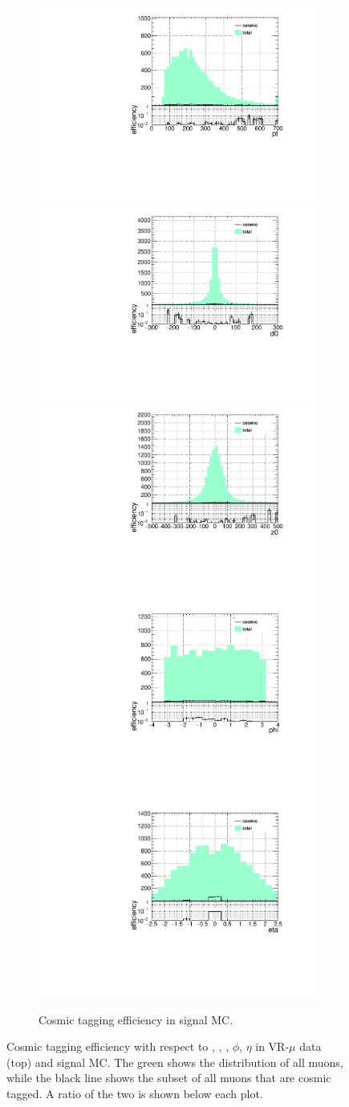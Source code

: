 \begin{figure}[h]
  \begin{subfigure}[b]{\textwidth}
  	\centering
  	\includegraphics[width=.3\textwidth]{figures/cosmics/mc_300_ratio_pt.pdf}
  	\includegraphics[width=.3\textwidth]{figures/cosmics/mc_300_ratio_d0.pdf}
  	\includegraphics[width=.3\textwidth]{figures/cosmics/mc_300_ratio_z0.pdf}
  	\includegraphics[width=.3\textwidth]{figures/cosmics/mc_300_ratio_phi.pdf}
  	\includegraphics[width=.3\textwidth]{figures/cosmics/mc_300_ratio_eta.pdf}
  	\caption{Cosmic tagging efficiency in signal \ac{MC}.}
  \end{subfigure}
    \caption{Cosmic tagging efficiency with respect to \pt, \dz, \z, $\phi$, $\eta$ in VR-$\mu$ data (top) and signal \ac{MC}. The green shows the distribution of all muons, while the black line shows the subset of all muons that are cosmic tagged. A ratio of the two is shown below each plot.}
  \label{fig:cos_eff}
\end{figure}





